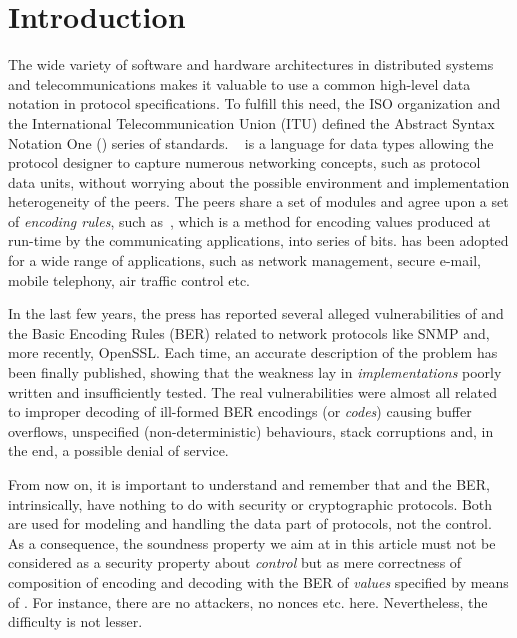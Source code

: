 
\section{Introduction}

The wide variety of software and hardware architectures in distributed
systems and telecommunications makes it valuable to use a common
high-level data notation in protocol specifications. To fulfill this
need, the ISO organization and the International Telecommunication
Union (ITU) defined the Abstract Syntax Notation One (\ASN) series of
standards. \ASN~\cite{Dubuisson:2000,X.680:2002,X.681:2002,X.682:2002,X.683:2002}
is a language for data types allowing the protocol designer to capture
numerous networking concepts, such as protocol data units, without
worrying about the possible environment and implementation
heterogeneity of the peers. The peers share a set of \ASN modules and
agree upon a set of \emph{encoding rules}, such
as~\cite{X.690:2002,X.691:2002}, which is a method for encoding values
produced at run-time by the communicating applications, into series of
bits. \ASN has been adopted for a wide range of applications, such as
network management, secure e-mail, mobile telephony, air traffic
control etc.

\medskip

In the last few years, the press has reported several alleged
vulnerabilities of \ASN and the Basic Encoding Rules (BER) related to
network protocols like SNMP and, more recently, OpenSSL. Each time, an
accurate description of the problem has been finally published,
showing that the weakness lay in \emph{implementations} poorly written
and insufficiently tested. The real vulnerabilities were almost all
related to improper decoding of ill-formed BER encodings (or
\emph{codes}) causing buffer overflows, unspecified
(non-deterministic) behaviours, stack corruptions and, in the end, a
possible denial of service.

\medskip

From now on, it is important to understand and remember that \ASN and
the BER, intrinsically, have nothing to do with security or
cryptographic protocols. Both are used for modeling and handling the
data part of protocols, not the control. As a consequence, the
soundness property we aim at in this article must not be considered as
a security property about \emph{control} but as mere correctness of
composition of encoding and decoding with the BER of \emph{values}
specified by means of \ASN. For instance, there are no attackers, no
nonces etc. here. Nevertheless, the difficulty is not lesser.

